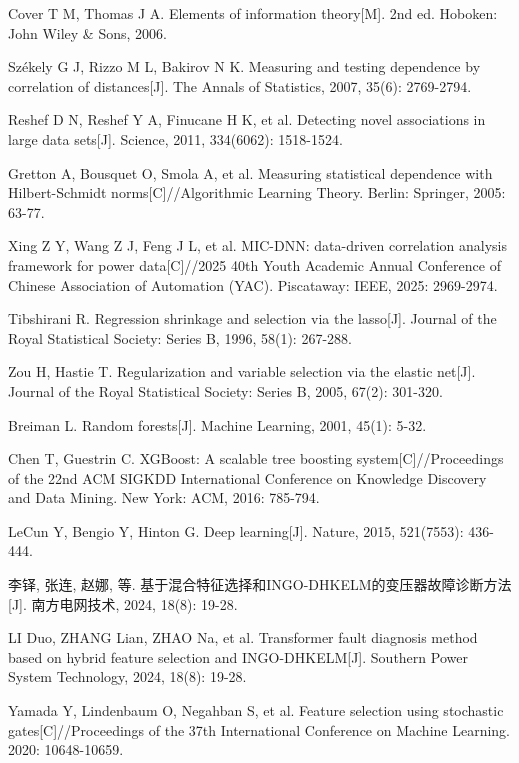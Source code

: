 Cover T M, Thomas J A. Elements of information theory[M]. 2nd ed. Hoboken: John Wiley \& Sons, 2006.

Székely G J, Rizzo M L, Bakirov N K. Measuring and testing dependence by correlation of distances[J]. The Annals of Statistics, 2007, 35(6): 2769-2794.

Reshef D N, Reshef Y A, Finucane H K, et al. Detecting novel associations in large data sets[J]. Science, 2011, 334(6062): 1518-1524.

Gretton A, Bousquet O, Smola A, et al. Measuring statistical dependence with Hilbert-Schmidt norms[C]//Algorithmic Learning Theory. Berlin: Springer, 2005: 63-77.

Xing Z Y, Wang Z J, Feng J L, et al. MIC-DNN: data-driven correlation analysis framework for power data[C]//2025 40th Youth Academic Annual Conference of Chinese Association of Automation (YAC). Piscataway: IEEE, 2025: 2969-2974.

Tibshirani R. Regression shrinkage and selection via the lasso[J]. Journal of the Royal Statistical Society: Series B, 1996, 58(1): 267-288.

Zou H, Hastie T. Regularization and variable selection via the elastic net[J]. Journal of the Royal Statistical Society: Series B, 2005, 67(2): 301-320.

Breiman L. Random forests[J]. Machine Learning, 2001, 45(1): 5-32.

Chen T, Guestrin C. XGBoost: A scalable tree boosting system[C]//Proceedings of the 22nd ACM SIGKDD International Conference on Knowledge Discovery and Data Mining. New York: ACM, 2016: 785-794.

LeCun Y, Bengio Y, Hinton G. Deep learning[J]. Nature, 2015, 521(7553): 436-444.

李铎, 张连, 赵娜, 等. 基于混合特征选择和INGO-DHKELM的变压器故障诊断方法[J]. 南方电网技术, 2024, 18(8): 19-28.

LI Duo, ZHANG Lian, ZHAO Na, et al. Transformer fault diagnosis method based on hybrid feature selection and INGO-DHKELM[J]. Southern Power System Technology, 2024, 18(8): 19-28.

Yamada Y, Lindenbaum O, Negahban S, et al. Feature selection using stochastic gates[C]//Proceedings of the 37th International Conference on Machine Learning. 2020: 10648-10659.

